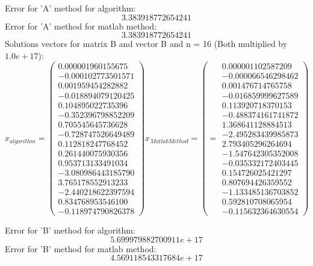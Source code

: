 \documentclass[12pt]{report}
\begin{document}
Error for 'A' method for algorithm: \[ 3.383918772654241 \]
Error for 'A' method for matlab method: \[ 3.383918772654241 \]
\newpage
Solutions vectors for matrix B and vector B and n = 16 (Both multiplied by $ 1.0e+17 $):
\[ x_{algorithm} = \left( \begin{array}{cc}
  0.000001960155675 \\
  -0.000102773501571 \\
  0.001959454282882 \\
  -0.018894079120425 \\
  0.104895022735396 \\
  -0.352396798852209 \\
  0.705545645736628 \\
  -0.728747526649489 \\
  0.112818247768452 \\
  0.261440075930356 \\
  0.953713133491034 \\
  -3.080986443185790 \\
  3.765178552913233 \\
  -2.440218622397594 \\
  0.834768953546100 \\
  -0.118974790826378
\end{array} \right)
%
x_{Matlab Method} = \left(  = \begin{array}{cc}
  0.000001102587209 \\
  -0.000066546298462 \\
  0.001476714765758 \\
  -0.016859999627589 \\
  0.113920718370153 \\
  -0.488374161741872 \\
  1.368641128884513 \\
  -2.495283439985873 \\
  2.793405296264694 \\
  -1.547642305352008 \\
  -0.035332172403445 \\
  0.154726025421297 \\
  0.807694426359552 \\
  -1.133485136703852 \\
  0.592810708065954 \\
  -0.115632364630554
\end{array} \right)
\]

Error for 'B' method for algorithm: \[ 5.699979882700911e+17 \]
Error for 'B' method for matlab method: \[ 4.569118543317684e+17 \]
\end{document}
